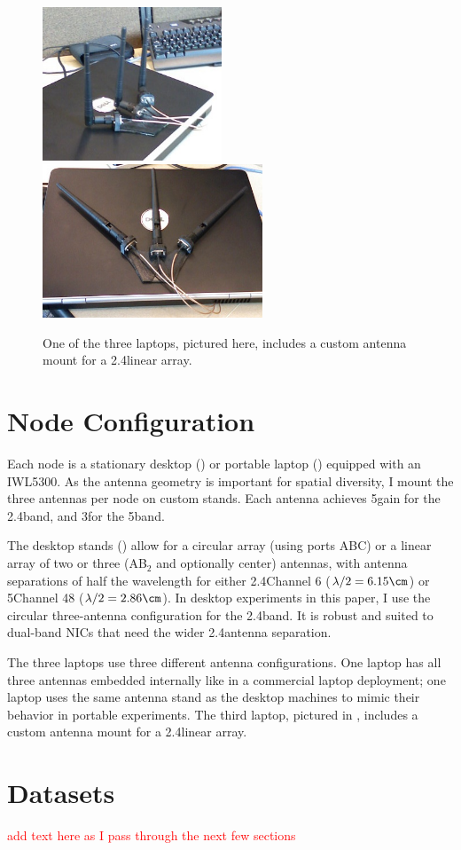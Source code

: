 \begin{figure}[ht]
	\centering
	\includegraphics[height=1.8in]{figures/laptop_stand_cropped_up.jpg}%
	\hspace{0.6in}%
	\includegraphics[height=1.8in]{figures/laptop_stand_cropped.jpg}
	\caption[A custom laptop antenna stand]{\label{fig:laptop_stands}One of the three laptops, pictured here, includes a custom antenna mount for a 2.4\GHz linear array.}
\end{figure}

\section{Node Configuration}
Each node is a stationary desktop () or portable laptop () equipped with an IWL5300. As the antenna geometry is important for spatial diversity, I mount the three antennas per node on custom stands. Each antenna achieves 5\dBi gain for the 2.4\GHz band, and 3\dBi for the 5\GHz band.

The desktop stands () allow for a circular array (using ports ABC) or a linear array of two or three (AB$_2$ and optionally center) antennas, with antenna separations of half the wavelength for either 2.4\GHz Channel 6 ($\lambda/2 = 6.15\cm$) or 5\GHz Channel 48 ($\lambda/2=2.86\cm$). In desktop experiments in this paper, I use the circular three-antenna configuration for the 2.4\GHz band. It is robust and suited to dual-band NICs that need the wider 2.4\GHz antenna separation. 

The three laptops use three different antenna configurations. One laptop has all three antennas embedded internally like in a commercial laptop deployment; one laptop uses the same antenna stand as the desktop machines to mimic their behavior in portable experiments. The third laptop, pictured in , includes a custom antenna mount for a 2.4\GHz linear array.
\section{Datasets}
\textcolor{red}{add text here as I pass through the next few sections}

\ifx\mainfile\undefined

\fi
